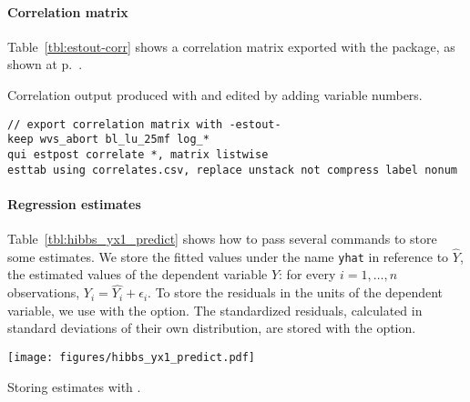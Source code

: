 %
\paragraph{Correlation matrix}%
  Table~\ref{tbl:estout-corr} shows a correlation matrix exported with the  package, as shown at p.~\pageref{tbl:correlate_export}.%

\begin{fullwidth}
	\begin{table}
		\footnotesize
    
		\caption{Correlation output produced with  and edited by adding variable numbers.}
		\label{tbl:estout-corr}
	\end{table}
\end{fullwidth}

\begin{verbatim}
// export correlation matrix with -estout-
keep wvs_abort bl_lu_25mf log_*
qui estpost correlate *, matrix listwise
esttab using correlates.csv, replace unstack not compress label nonum
\end{verbatim}

%
%
%
\paragraph{Regression estimates}

Table~\ref{tbl:hibbs_yx1_predict} shows how to pass several  commands to store some estimates. We store the fitted values under the name \texttt{yhat} in reference to $\hat{Y}$, the estimated values of the dependent variable $Y$: for every $i=1, \ldots, n$ observations, $Y_i = \hat{Y_i} + \epsilon_i$. To store the residuals in the units of the dependent variable, we use  with the  option. The standardized residuals, calculated in standard deviations of their own distribution, are stored with the  option.

\begin{table}[htp]
	\texttt{[image: figures/hibbs\_yx1\_predict.pdf]}

	\caption[Storing estimates with ]{\label{tbl:hibbs_yx1_predict}
	Storing estimates with .\\
	}
\end{table}%

